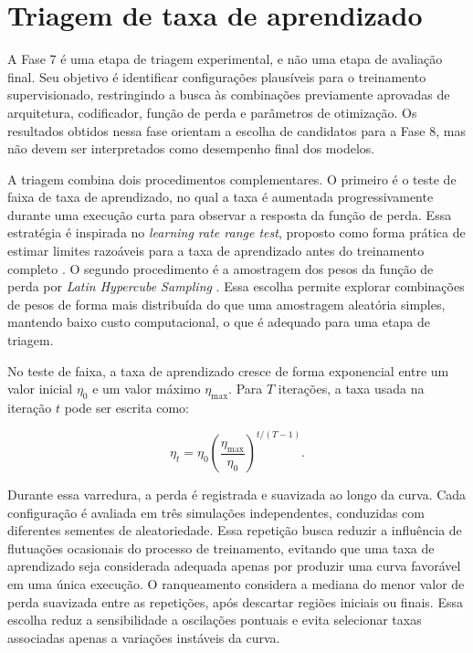 \section{Triagem de taxa de aprendizado}\label{sec:met_lr_finder}

A Fase 7 é uma etapa de triagem experimental, e não uma etapa de avaliação
final. Seu objetivo é identificar configurações plausíveis para o treinamento
supervisionado, restringindo a busca às combinações previamente aprovadas de
arquitetura, codificador, função de perda e parâmetros de otimização. Os
resultados obtidos nessa fase orientam a escolha de candidatos para a Fase 8,
mas não devem ser interpretados como desempenho final dos modelos.

A triagem combina dois procedimentos complementares. O primeiro é o teste de
faixa de taxa de aprendizado, no qual a taxa é aumentada progressivamente
durante uma execução curta para observar a resposta da função de perda. Essa
estratégia é inspirada no \textit{learning rate range test}, proposto como forma
prática de estimar limites razoáveis para a taxa de aprendizado antes do
treinamento completo \cite{smith2017cyclical}. O segundo procedimento é a
amostragem dos pesos da função de perda por \textit{Latin Hypercube Sampling}
\cite{mckay1979comparison}. Essa escolha permite explorar combinações de pesos
de forma mais distribuída do que uma amostragem aleatória simples, mantendo baixo
custo computacional, o que é adequado para uma etapa de triagem.

No teste de faixa, a taxa de aprendizado cresce de forma exponencial entre um
valor inicial $\eta_0$ e um valor máximo $\eta_{\max}$. Para $T$ iterações, a
taxa usada na iteração $t$ pode ser escrita como:

\begin{equation}
    \eta_t =
    \eta_0
    \left(
    \frac{\eta_{\max}}{\eta_0}
    \right)^{t/(T-1)} .
    \label{eq:lr_exponencial}
\end{equation}

Durante essa varredura, a perda é registrada e suavizada ao longo da curva. Cada
configuração é avaliada em três simulações independentes, conduzidas com
diferentes sementes de aleatoriedade. Essa repetição busca reduzir a influência
de flutuações ocasionais do processo de treinamento, evitando que uma taxa de
aprendizado seja considerada adequada apenas por produzir uma curva favorável em
uma única execução. O ranqueamento considera a mediana do menor valor de perda
suavizada entre as repetições, após descartar regiões iniciais ou finais. Essa
escolha reduz a sensibilidade a oscilações pontuais e evita selecionar taxas
associadas apenas a variações instáveis da curva.

